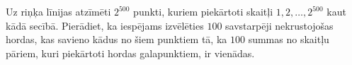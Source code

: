 \begin{problem}
Uz riņķa līnijas atzīmēti $2^{500}$ punkti, kuriem piekārtoti skaitļi $1, 2, \dots , 2^{500}$ kaut kādā secībā. Pierādiet, ka iespējams izvēlēties $100$ savstarpēji nekrustojošas hordas, kas savieno kādus no šiem punktiem tā, ka $100$ summas no skaitļu pāriem, kuri piekārtoti hordas galapunktiem, ir vienādas.

\end{problem}





%

